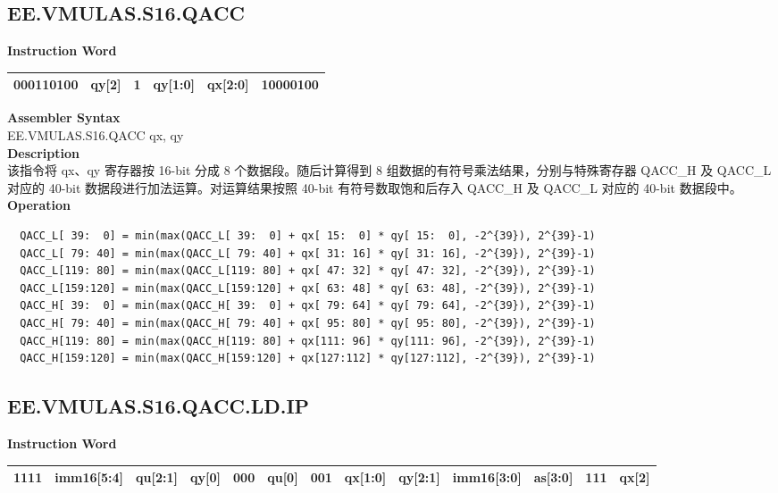 \clearpage
\subsection{EE.VMULAS.S16.QACC}\label{instruction:EEVMULASS16QACC}
\setlength\tabcolsep{6pt}
\textbf{Instruction Word} \\
\begin{tabular}{|c|c|c|c|c|c|}
	\hline
	000110100 & qy[2] & 1 & qy[1:0] & qx[2:0] & 10000100 \\
	\hline
\end{tabular}

\textbf{Assembler Syntax} \\
EE.VMULAS.S16.QACC qx, qy \\
\textbf{Description} \\
该指令将 qx、qy 寄存器按 16-bit 分成 8 个数据段。随后计算得到 8 组数据的有符号乘法结果，分别与特殊寄存器 QACC\_H 及 QACC\_L 对应的 40-bit 数据段进行加法运算。对运算结果按照 40-bit 有符号数取饱和后存入 QACC\_H 及 QACC\_L 对应的 40-bit 数据段中。\\
\textbf{Operation}
\begin{lstlisting}
  QACC_L[ 39:  0] = min(max(QACC_L[ 39:  0] + qx[ 15:  0] * qy[ 15:  0], -2^{39}), 2^{39}-1)
  QACC_L[ 79: 40] = min(max(QACC_L[ 79: 40] + qx[ 31: 16] * qy[ 31: 16], -2^{39}), 2^{39}-1)
  QACC_L[119: 80] = min(max(QACC_L[119: 80] + qx[ 47: 32] * qy[ 47: 32], -2^{39}), 2^{39}-1)
  QACC_L[159:120] = min(max(QACC_L[159:120] + qx[ 63: 48] * qy[ 63: 48], -2^{39}), 2^{39}-1)
  QACC_H[ 39:  0] = min(max(QACC_H[ 39:  0] + qx[ 79: 64] * qy[ 79: 64], -2^{39}), 2^{39}-1)
  QACC_H[ 79: 40] = min(max(QACC_H[ 79: 40] + qx[ 95: 80] * qy[ 95: 80], -2^{39}), 2^{39}-1)
  QACC_H[119: 80] = min(max(QACC_H[119: 80] + qx[111: 96] * qy[111: 96], -2^{39}), 2^{39}-1)
  QACC_H[159:120] = min(max(QACC_H[159:120] + qx[127:112] * qy[127:112], -2^{39}), 2^{39}-1)
\end{lstlisting}

\clearpage
\subsection{EE.VMULAS.S16.QACC.LD.IP}\label{instruction:EEVMULASS16QACCLDIP}
\setlength\tabcolsep{6pt}
\textbf{Instruction Word} \\
\begin{tabular}{|c|c|c|c|c|c|c|c|c|c|c|c|c|}
	\hline
	1111 & imm16[5:4] & qu[2:1] & qy[0] & 000 & qu[0] & 001 & qx[1:0] & qy[2:1] & imm16[3:0] & as[3:0] & 111 & qx[2] \\
	\hline
\end{tabular}

